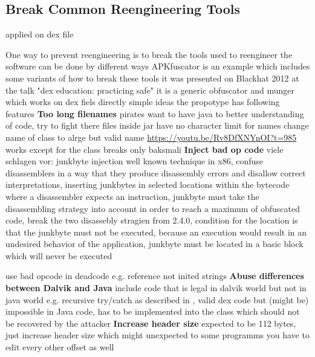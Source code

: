 \subsection{Break Common Reengineering Tools}
\label{subsection:counter-reengineering-break}
applied on dex file

One way to prevent reengineering is to break the tools used to reengineer the software
can be done by different ways
APKfuscator\cite{githubApkfuscator} is an example which includes some variants of how to break these tools
it was presented on Blackhat 2012 at the talk "dex education: practicing safe"\cite{safedexVideo} \cite{safedexSlides}
it is a generic obfuscator and munger which works on dex fiels directly
simple ideas
the propotype has following features
\newline
\newline
\textbf{Too long filenames} \newline
pirates want to have java to better understanding of code, try to fight there
files inside jar have no character limit for names
change name of class to alrge but valid name
\url{https://youtu.be/Rv8DfXNYnOI?t=985} works except for the class\newline
breaks only baksmali
\newline
\newline
\textbf{Inject bad op code} \newline
%
viele schlagen vor:
junkbyte injection
well known technique in x86, confuse disassemblers in a way that they produce disassembly errors and disallow correct interpretations, inserting junkbytes in selected locations within the bytecode where a disassembler expects an instruction, junkbyte must take the disassembling strategy into account in order to reach a maximum of obfuscated code, break the two disassebly stragien from 2.4.0, condition for the location is that the junkbyte must not be executed, because an execution would result in an undesired behavior of the application,  junkbyte must be located in a basic block which will never be executed
\cite{schulzLabCourse}
%

use bad opcode in deadcode \newline
e.g. reference not inited strings \cite{safedexSlides}
\newline
\newline
\textbf{Abuse differences between Dalvik and Java} \newline
include code that is legal in dalvik world but not in java world
e.g. recursive try/catch as described in \cite{safedexSlides}, valid dex code but (might be) impossible in Java code, has to be implemented into the class which should not be recovered by the attacker
\newline
\newline
\textbf{Increase header size} \newline
expected to be 112 bytes, just increase header size which might unexpected to some programms
you have to edit every other offset as well\newline
